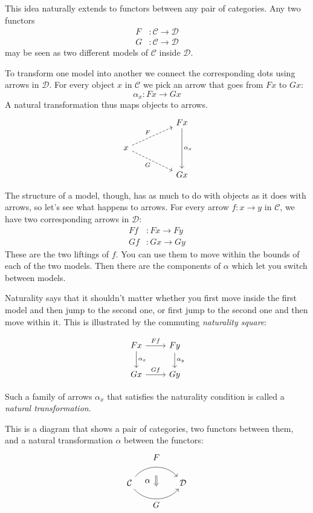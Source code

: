 \documentclass[DaoFP]{subfiles}
\begin{document}
This idea naturally extends to functors between any pair of categories. Any two functors
\begin{align*}
F &\colon \mathcal{C} \to \mathcal{D} \\
G &\colon \mathcal{C} \to \mathcal{D}
\end{align*}
may be seen as two different models of $\mathcal{C}$ inside $\mathcal{D}$. 

To transform one model into another we connect the corresponding dots using arrows in $\mathcal{D}$. For every object $x$ in $\mathcal{C}$ we pick an arrow that goes from $F x$ to $G x$:
\[ \alpha_x \colon F x \to G x \]
A natural transformation thus maps objects to arrows.
\[
 \begin{tikzcd}
 && F x
 \arrow[dd, "\alpha_x"]
 \\
 x
 \arrow[rru, dashed, "F"]
 \arrow[rrd, dashed, "G"']
 \\
 && G x
 \end{tikzcd}
\]


The structure of a model, though, has as much to do with objects as it does with arrows, so let's see what happens to arrows. For every arrow $f \colon x \to y$ in $\mathcal{C}$, we have two corresponding arrows in $\mathcal{D}$:
\begin{align*}
 F f &\colon F x \to F y \\
G f &\colon G x \to G y 
\end{align*}
These are the two liftings of $f$. You can use them to move within the bounds of each of the two models. Then there are the components of $\alpha$ which let you switch between models. 

Naturality says that it shouldn't matter whether you first move inside the first model and then jump to the second one, or first jump to the second one and then move within it. This is illustrated by the commuting \emph{naturality square}:

\[
 \begin{tikzcd}
 F x
 \arrow[d, "\alpha_x"]
 \arrow[r, "F f"]
 &
F y
  \arrow[d, "\alpha_y"]
 \\
G x
 \arrow[r, "G f"]
& G y
 \end{tikzcd}
\]

Such a family of arrows $\alpha_x$ that satisfies the naturality condition is called a \emph{natural transformation}.

This is a diagram that shows a pair of categories, two functors between them, and a natural transformation $\alpha$ between the functors:
\[
\begin{tikzcd}[column sep=huge]
\mathcal{C}
  \arrow[bend left=50]{r}[name=U, label=above:$F$]{}
  \arrow[bend right=50]{r}[name=D, label=below:$G$]{} 
 &
\mathcal{D}
  \arrow[shorten <=10pt,shorten >=10pt,Rightarrow,to path={(U) -- node[label=left:$\alpha$] {} (D)}]{}
\end{tikzcd}
\]
\end{document}
